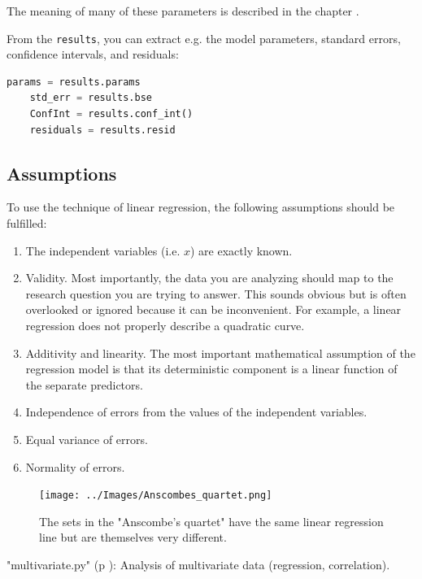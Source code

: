 The meaning of many of these parameters is described in the chapter .

From the \texttt{results}, you can extract e.g. the model parameters, standard errors, confidence intervals, and residuals:

\begin{lstlisting}[language=Python]
    params = results.params
    std_err = results.bse
    ConfInt = results.conf_int()
    residuals = results.resid
\end{lstlisting}

\subsection{Assumptions}

To use the technique of linear regression, the following assumptions should be fulfilled:

\begin{enumerate}
  \item The independent variables (i.e. $x$) are exactly known.
  \item Validity. Most importantly, the data you are analyzing should map to the research question you are trying to answer. This sounds obvious but is often overlooked or ignored because it can be inconvenient. For example, a linear regression does not properly describe a quadratic curve.
  \item Additivity and linearity. The most important mathematical assumption of the regression model is that its deterministic component is a linear function of the separate predictors.
  \item Independence of errors from the values of the independent variables.
  \item Equal variance of errors.
  \item Normality of errors.
\end{enumerate}

\begin{figure}
  \centering
  \texttt{[image: ../Images/Anscombes\_quartet.png]}\\
  \caption{The sets in the "Anscombe's quartet" have the same linear regression line but are themselves very different.}
\end{figure}

\PyImg "multivariate.py" (p \pageref{py:multivariate}): Analysis of multivariate data (regression, correlation).

